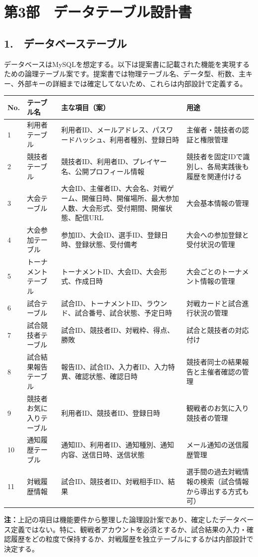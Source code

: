 \documentclass{jsarticle}
\begin{document}
\section*{第3部　データテーブル設計書}
\subsection*{1.　データベーステーブル}
データベースはMySQLを想定する。以下は提案書に記載された機能を実現するための論理テーブル案です。提案書では物理テーブル名、データ型、桁数、主キー、外部キーの詳細までは確定してないため、これらは内部設計で定義する。

\noindent
\begin{tabularx}{\textwidth}{|l|X|X|X|}
    \hline
    \textbf{No.} & \textbf{テーブル名} & \textbf{主な項目（案）} & \textbf{用途} \\ 
    \hline
    1 & 利用者テーブル & 利用者ID、メールアドレス、パスワードハッシュ、利用者種別、登録日時 & 主催者・競技者の認証と権限管理 \\ \hline
    2 & 競技者テーブル & 競技者ID、利用者ID、プレイヤー名、公開プロフィール情報 & 競技者を固定IDで識別し、各局実践後も履歴を関連付ける \\ \hline
    3 & 大会テーブル & 大会ID、主催者ID、大会名、対戦ゲーム、開催日時、開催場所、最大参加人数、大会形式、受付期間、開催状態、配信URL & 大会基本情報の管理 \\ \hline
    4 & 大会参加テーブル & 参加ID、大会ID、選手ID、登録日時、登録状態、受付備考 & 大会への参加登録と受付状況の管理 \\ \hline
    5 & トーナメントテーブル & トーナメントID、大会ID、大会形式、作成日時 & 大会ごとのトーナメント情報の管理 \\ \hline
    6 & 試合テーブル & 試合ID、トーナメントID、ラウンド、試合番号、試合状態、予定日時 & 対戦カードと試合進行状況の管理 \\ \hline
    7 & 試合競技者テーブル & 試合ID、競技者ID、対戦枠、得点、勝敗 & 試合と競技者の対応付け \\ \hline
    8 & 試合結果報告テーブル & 報告ID、試合ID、入力者ID、入力特異、確認状態、確認日時 & 競技者同士の結果報告と主催者確認の管理 \\ \hline
    9 & 競技者お気に入りテーブル & 利用者ID、競技者ID、登録日時 & 観戦者のお気に入り競技者の管理 \\ \hline
    10 & 通知履歴テーブル & 通知ID、利用者ID、通知種別、通知内容、送信日時、送信状態 & メール通知の送信履歴管理 \\ \hline
    11 & 対戦履歴情報 & 試合ID、競技者ID、対戦相手ID、結果 & 選手間の過去対戦情報の検索（試合情報から導出する方式も可） \\ \hline
    
\end{tabularx}

\vspace{1em}
\noindent
\textbf{注：}上記の項目は機能要件から整理した論理設計案であり、確定したデータベース定義ではない。特に、観戦者アカウントを必須とするか、試合結果の入力・確認履歴をどの粒度で保持するか、対戦履歴を独立テーブルにするかは内部設計で決定する。
\end{document}
